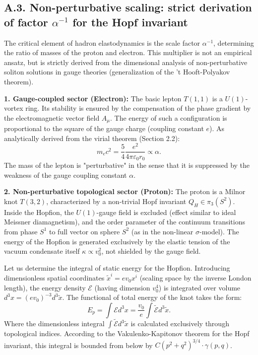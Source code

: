 \documentclass[11pt,a4paper]{article}
\begin{document}
\subsection*{A.3. Non-perturbative scaling: strict derivation of factor $\alpha^{-1}$ for the Hopf invariant}

The critical element of hadron elastodynamics is the scale factor $\alpha^{-1}$, determining the ratio of masses of the proton and electron. This multiplier is not an empirical ansatz, but is strictly derived from the dimensional analysis of non-perturbative soliton solutions in gauge theories (generalization of the 't Hooft-Polyakov theorem).

\textbf{1. Gauge-coupled sector (Electron):}
The basic lepton $T(1,1)$ is a $U(1)$-vortex ring. Its stability is ensured by the compensation of the phase gradient by the electromagnetic vector field $A_\mu$. The energy of such a configuration is proportional to the square of the gauge charge (coupling constant $e$). As analytically derived from the virial theorem (Section 2.2):
\begin{equation}
	m_e c^2 = \frac{5}{4} \frac{e^2}{4\pi\varepsilon_0 r_0} \propto \alpha.
\end{equation}
The mass of the lepton is "perturbative" in the sense that it is suppressed by the weakness of the gauge coupling constant $\alpha$.

\textbf{2. Non-perturbative topological sector (Proton):}
The proton is a Milnor knot $T(3,2)$, characterized by a non-trivial Hopf invariant $Q_H \in \pi_3(S^2)$.
Inside the Hopfion, the $U(1)$-gauge field is excluded (effect similar to ideal Meissner diamagnetism), and the order parameter of the continuum transitions from phase $S^1$ to full vector on sphere $S^2$ (as in the non-linear $\sigma$-model). The energy of the Hopfion is generated exclusively by the elastic tension of the vacuum condensate itself $\kappa \propto v_0^2$, not shielded by the gauge field.

Let us determine the integral of static energy for the Hopfion. Introducing dimensionless spatial coordinates $\tilde{x}^i = e v_0 x^i$ (scaling space by the inverse London length), the energy density $\mathcal{E}$ (having dimension $v_0^4$) is integrated over volume $d^3x = (e v_0)^{-3} d^3\tilde{x}$.
The functional of total energy of the knot takes the form:
\begin{equation}
	E_p = \int \mathcal{E} d^3x = \frac{v_0}{e} \int \tilde{\mathcal{E}} d^3\tilde{x}.
\end{equation}
Where the dimensionless integral $\int \tilde{\mathcal{E}} d^3\tilde{x}$ is calculated exclusively through topological indices. According to the Vakulenko-Kapitonov theorem for the Hopf invariant, this integral is bounded from below by $C (p^2+q^2)^{3/4} \cdot \gamma(p,q)$.
\end{document}
